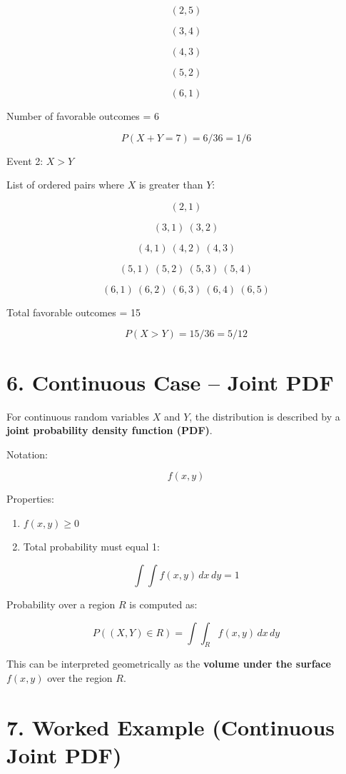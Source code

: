 \documentclass{article}
\begin{document}
\[
(2,5)
\]

\[
(3,4)
\]

\[
(4,3)
\]

\[
(5,2)
\]

\[
(6,1)
\]

Number of favorable outcomes = 6

\[
P(X + Y = 7) = 6 / 36 = 1/6
\]

Event 2: $X > Y$

List of ordered pairs where $X$ is greater than $Y$:

\[
(2,1)
\]

\[
(3,1)\ (3,2)
\]

\[
(4,1)\ (4,2)\ (4,3)
\]

\[
(5,1)\ (5,2)\ (5,3)\ (5,4)
\]

\[
(6,1)\ (6,2)\ (6,3)\ (6,4)\ (6,5)
\]

Total favorable outcomes = 15

\[
P(X > Y) = 15 / 36 = 5 / 12
\]

\bigskip

\section*{6. Continuous Case – Joint PDF}

For continuous random variables $X$ and $Y$, the distribution is described by a \textbf{joint probability density function (PDF)}.

Notation:

\[
f(x, y)
\]

Properties:

\begin{enumerate}
\item $f(x, y) \geq 0$
\item Total probability must equal 1:
\end{enumerate}

\[
\int\int f(x, y) \, dx \, dy = 1
\]

Probability over a region $R$ is computed as:

\[
P((X, Y) \in R) = \int\int_R f(x, y) \, dx \, dy
\]

This can be interpreted geometrically as the \textbf{volume under the surface $f(x,y)$} over the region $R$.

\bigskip

\section*{7. Worked Example (Continuous Joint PDF)}
\end{document}
